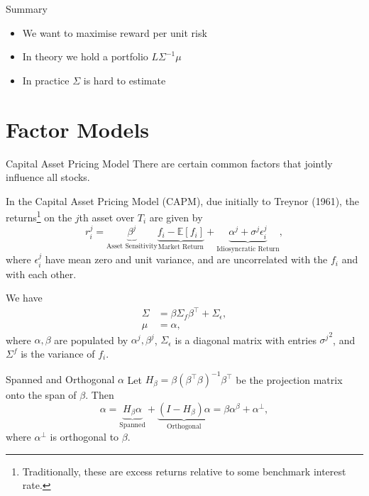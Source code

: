 \documentclass{beamer}
\newcommand{\sectionquote}[1]{\def\insertsquote{#1}}
\newcommand{\insertsquote}{}
\renewcommand{\insertsquote}{}
\begin{document}
\begin{frame}{Summary}
	\begin{itemize}
		\item We want to maximise reward per unit risk
		\item In theory we hold a portfolio $L\Sigma^{-1}\mu$
		\item In practice $\Sigma$ is hard to estimate
	\end{itemize}
\end{frame}

\sectionquote{``Every researcher has their own research process. This is part of their competitive advantage; it's indeed part of what they are, of thoughts and learned lessons accumulated over a lifetime of experiences and studying.'' Giuseppe Paleologo}
\section{Factor Models}
\begin{frame}{Capital Asset Pricing Model}
	There are certain common factors that jointly influence all stocks.

	In the Capital Asset Pricing Model (CAPM), due initially to Treynor (1961), the returns\footnote{Traditionally, these are excess returns relative to some benchmark interest rate.} on the $j$th asset over $T_i$ are given by
	$$r_i^j = \underbrace{\beta^j}_{\textrm{Asset Sensitivity}} \underbrace{f_i-\mathbb{E}[f_i]}_{\textrm{Market Return}} + \underbrace{\alpha^j + \sigma^j\epsilon_i^j}_{\textrm{Idiosyncratic Return}},$$ 
	where $\epsilon_i^j$ have mean zero and unit variance, and are uncorrelated with the $f_i$ and with each other.

	We have
	\begin{align*}
		\Sigma	&= \beta \Sigma_f \beta^\top + \Sigma_\epsilon,
	\\	\mu	&= \alpha,
	\end{align*}
	where $\alpha,\beta$ are populated by $\alpha^j,\beta^j$, $\Sigma_\epsilon$ is a diagonal matrix with entries ${\sigma^j}^2$, and $\Sigma^f$ is the variance of $f_i$.
\end{frame}

\begin{frame}{Spanned and Orthogonal $\alpha$}
	Let $H_\beta=\beta (\beta^\top \beta)^{-1}\beta^\top$ be the projection matrix onto the span of $\beta$. Then
	$$\alpha = \underbrace{H_\beta\alpha}_{\textrm{Spanned}} + \underbrace{(I-H_\beta) \alpha}_{\textrm{Orthogonal}} = \beta \alpha^\beta + \alpha^\bot,$$
	where $\alpha^\bot$ is orthogonal to $\beta$.
\end{frame}
\end{document}
